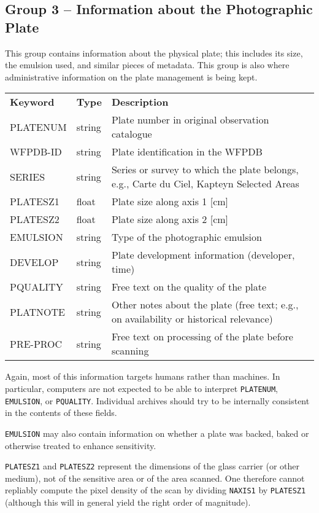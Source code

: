 \documentclass[11pt]{ivoa}
\newcommand\cardname[1]{\texttt{\color{keyword}#1}}
\begin{document}
\subsection{Group 3 – Information about the Photographic Plate}

This group contains information about the physical plate; this includes
its size, the emulsion used, and similar pieces of metadata.  This group
is also where administrative information on the plate management is
being kept.

\begin{inlinetable}
\footnotesize
\begin{tabular}{llp{}}
\sptablerule
\textbf{Keyword}&\textbf{Type}&\textbf{Description}\\
\sptablerule
PLATENUM &string &Plate number in original observation
catalogue\\
WFPDB-ID &string &Plate identification in the WFPDB\\
SERIES   &string &Series or survey to which the plate belongs,
e.g., Carte du Ciel, Kapteyn Selected Areas\\
PLATESZ1 &float  &Plate size along axis 1 [cm]\\
PLATESZ2 &float  &Plate size along axis 2 [cm]\\
EMULSION &string &Type of the photographic emulsion\\
DEVELOP  &string &Plate development information (developer,
time)\\
PQUALITY &string &Free text on the quality of the plate\\
PLATNOTE &string &Other notes about the plate (free text; e.g., on
availability or historical relevance)\\
PRE-PROC  &string &Free text on processing of the plate before
scanning\\
\end{tabular}
\end{inlinetable}

Again, most of this information targets humans rather than machines.  In
particular, computers are not expected to be able to interpret
\cardname{PLATENUM}, \cardname{EMULSION}, or \cardname{PQUALITY}.
Individual archives should try to be internally consistent in the
contents of these fields.

\cardname{EMULSION} may also contain information on whether a plate
was backed, baked or otherwise treated to enhance sensitivity.

\cardname{PLATESZ1} and \cardname{PLATESZ2} represent the dimensions of
the glass carrier (or other medium), not of the sensitive area or of the area scanned.
One therefore cannot repliably compute the pixel density of the scan by
dividing \cardname{NAXIS1} by \cardname{PLATESZ1} (although this will in
general yield the right order of magnitude).
\end{document}
